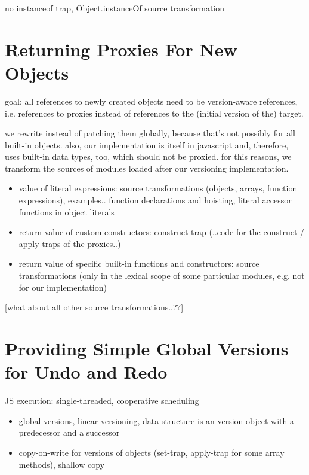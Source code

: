 no instanceof trap, Object.instanceOf source transformation 







\section{Returning Proxies For New Objects}

goal: all references to newly created objects need to be version-aware references, i.e. references to proxies instead of references to the (initial version of the) target. 

we rewrite instead of patching them globally, because that's not possibly for all built-in objects.
also, our implementation is itself in javascript and, therefore, uses built-in data types, too, which should not be proxied.
for this reasons, we transform the sources of modules loaded after our versioning implementation.

\begin{itemize}
    \item value of literal expressions: source transformations (objects, arrays, function expressions), examples.. function declarations and hoisting, literal accessor functions in object literals
    \item return value of custom constructors: construct-trap (..code for the construct / apply traps of the proxies..)
    \item return value of specific built-in functions and constructors: source transformations (only in the lexical scope of some particular modules, e.g. not for our implementation)
\end{itemize}

[what about all other source transformations..??]




\section{Providing Simple Global Versions for Undo and Redo}

JS execution: single-threaded, cooperative scheduling 

\begin{itemize}
    \item global versions, linear versioning, data structure is an version object with a predecessor and a successor
    \item copy-on-write for versions of objects (set-trap, apply-trap for some array methods), shallow copy
\end{itemize}


